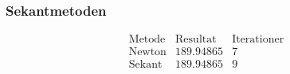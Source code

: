 \begin{frame}
\frametitle{Sekantmetoden}
$$\begin{array}{l|c|c}
\text{Metode} & \text{Resultat} & \text{Iterationer}\\
\hline
\text{Newton}		& 189.94865 & 7\\
\text{Sekant}		& 189.94865 & 9
\end{array}$$
\end{frame}